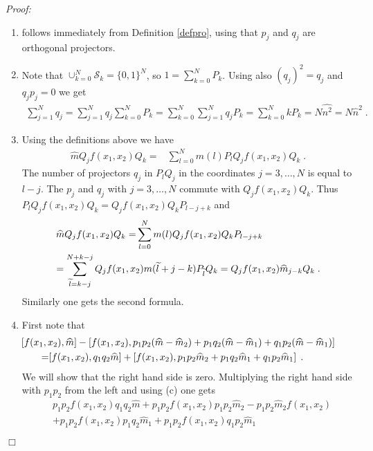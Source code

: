 \documentclass[11pt, english, american]{article}
\newenvironment{proof}{\emph{Proof:}}{\begin{flushright} $ \Box $ \end{flushright}}
\begin{document}
\begin{proof}\begin{enumerate}
 \item
follows immediately from Definition \ref{defpro}, using that $p_j$
and $q_j$ are orthogonal projectors.

\item Note that $\cup_{k=0}^N\mathcal{S}_k=\{0,1\}^N$, so $1=\sum_{k=0}^N P_k$. Using also
$(q_j)^2=q_j$ and $q_j p_j=0$ we get \begin{align*}
\sum_{j=1}^Nq_j=\sum_{j=1}^Nq_j\sum_{k=0}^N
P_k= \sum_{k=0}^N\sum_{j=1}^Nq_j
P_k=\sum_{k=0}^Nk P_k=N\widehat{n^2}=N\widehat{n}^2\;.\end{align*}


\item
Using the definitions above we have  \begin{align*} \widehat{m}
Q_j f(x_1,x_2)Q_k
%
=&\sum_{l=0}^N m(l)P_l Q_jf(x_1,x_2)Q_k
\;.
%
\end{align*}
The number of projectors $q_j$ in $P_l Q_j$ in the coordinates $j=3,\ldots,N$ is equal to $l-j$. The $p_j$ and $q_j$ with $j=3,\ldots,N$ commute with $Q_jf(x_1,x_2)Q_k$. Thus
$P_l Q_jf(x_1,x_2)Q_k= Q_jf(x_1,x_2)Q_kP_{l-j+k}$ and
\begin{align*}
\widehat{m}
Q_j f(x_1,x_2)Q_k=& \sum_{l=0}^N  m(l) Q_jf(x_1,x_2)Q_kP_{l-j+k}
%
\\&\hspace{-3cm}= \sum_{\widetilde l=k-j}^{N+k-j}  Q_jf(x_1,x_2)m(\widetilde l+j-k)P_{\widetilde l} Q_k
%
=Q_j f(x_1,x_2)\widehat{m}_{j-k}Q_k\;.
 \end{align*}
Similarly one gets the second formula.
\item First note that
\begin{align}\label{multsev}
&\hspace{-1cm}[f(x_1,x_2),\widehat{m}]-\left[f(x_1,x_2),p_1p_2(\widehat{m}-\widehat{m}_2)+p_1q_2(\widehat{m}-\widehat{m}_1)
+q_1p_2(\widehat{m}-\widehat{m}_1)\right]%
%
\nonumber\\=&[f(x_1,x_2),q_1q_2\widehat{m}]+\left[f(x_1,x_2),p_1p_2\widehat{m}_2+p_1q_2\widehat{m}_1
+q_1p_2\widehat{m}_1\right]%
%
\;.
\end{align}
We will show that the right hand side is zero.
Multiplying the right hand side with $p_1p_2$ from the left and using (c) one gets
\begin{align*}
&p_1p_2f(x_1,x_2)q_1q_2\widehat{m}+p_1p_2f(x_1,x_2)p_1p_2\widehat{m}_2-p_1p_2\widehat{m}_2f(x_1,x_2)
\\&+p_1p_2f(x_1,x_2)p_1q_2\widehat{m}_1+p_1p_2f(x_1,x_2)q_1p_2\widehat{m}_1%

\end{align*}
\end{enumerate}
\end{proof}
\end{document}
